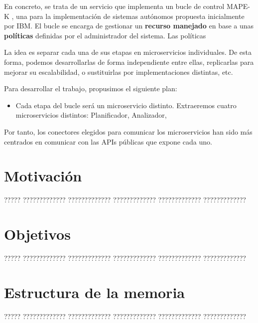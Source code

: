 En concreto, se trata de un servicio que implementa un bucle de control MAPE-K \cite{ArchitecturalBlueprintAutonomic2006, fonsServiciosAdaptivereadyPara2021}, una para la implementación de sistemas autónomos propuesta inicialmente por IBM. El bucle se encarga de gestionar un \textbf{recurso manejado} en base a unas \textbf{políticas} definidas por el administrador del sistema. Las políticas


La idea es separar cada una de sus etapas en microservicios individuales. De esta forma, podemos desarrollarlas de forma independiente entre ellas, replicarlas para mejorar su escalabilidad, o sustituirlas por implementaciones distintas, etc.

Para desarrollar el trabajo, propusimos el siguiente plan:
\begin{itemize}
  \item Cada etapa del bucle será un microservicio distinto. Extraeremos cuatro microservicios distintos: Planificador, Analizador,
\end{itemize}

Por tanto, los conectores elegidos para comunicar los microservicios han sido más centrados en comunicar con las APIs públicas que expone cada uno.

\section{Motivación}

????? ????????????? ????????????? ????????????? ????????????? ?????????????

\section{Objetivos}

????? ????????????? ????????????? ????????????? ????????????? ?????????????

\section{Estructura de la memoria}

????? ????????????? ????????????? ????????????? ????????????? ?????????????


